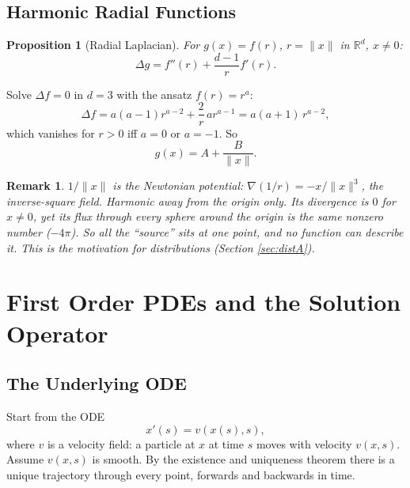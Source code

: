 \documentclass{article}
\newtheorem{remark}{Remark}
\newtheorem{proposition}{Proposition}
\begin{document}
\subsection{Harmonic Radial Functions}
\begin{proposition}[Radial Laplacian]
    For $g(x) = f(r)$, $r = \|x\|$ in $\mathbb{R}^d$, $x \neq 0$:
    \begin{equation}
        \Delta g = f''(r) + \frac{d-1}{r} f'(r).
    \end{equation}
\end{proposition}
Solve $\Delta f = 0$ in $d = 3$ with the ansatz $f(r) = r^a$:
\begin{equation}
    \Delta f = a(a-1)r^{a-2} + \frac{2}{r}\, a r^{a-1} = a(a+1)\, r^{a-2},
\end{equation}
which vanishes for $r > 0$ iff $a = 0$ or $a = -1$. So
\begin{equation}
    g(x) = A + \frac{B}{\|x\|}.
\end{equation}
\begin{remark}
    $1/\|x\|$ is the Newtonian potential: $\nabla(1/r) = -x/\|x\|^3$, the inverse-square field. Harmonic away from the origin only. Its divergence is $0$ for $x \neq 0$, yet its flux through every sphere around the origin is the same nonzero number ($-4\pi$). So all the ``source'' sits at one point, and no function can describe it. This is the motivation for distributions (Section \ref{sec:distA}).
\end{remark}


\section{First Order PDEs and the Solution Operator}

\subsection{The Underlying ODE}
Start from the ODE
\begin{equation}
    x'(s) = v(x(s), s),
\end{equation}
where $v$ is a velocity field: a particle at $x$ at time $s$ moves with velocity $v(x,s)$. Assume $v(x,s)$ is smooth. By the existence and uniqueness theorem there is a unique trajectory through every point, forwards and backwards in time.
\end{document}
